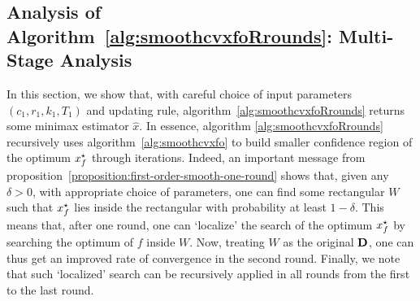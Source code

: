 

\subsection{Analysis of Algorithm~\ref{alg:smoothcvxfoRrounds}: Multi-Stage Analysis}
In this section, we show that, with careful choice of input parameters 
$(c_1, r_1, k_1, T_1)$ and updating rule, algorithm~\ref{alg:smoothcvxfoRrounds} 
returns some minimax estimator $\hat{x}$. In essence, algorithm 
\ref{alg:smoothcvxfoRrounds} recursively uses algorithm~\ref{alg:smoothcvxfo}
to build smaller confidence region of the optimum $x_f^\star$ through iterations.
Indeed, an important message from proposition~\ref{proposition:first-order-smooth-one-round} 
shows that, given any $\delta > 0$, with appropriate choice of parameters, one 
can find some rectangular $W$ such that $x_f^\star$ lies inside the rectangular 
with probability at least $1-\delta$. This means that, after one round, one can 
`localize' the search of the optimum $x_f^\star$ by searching the optimum of 
$f$ inside $W$. Now, treating $W$ as the original $\mathbf{D}$, one can 
thus get an improved rate of convergence in the second round. Finally, we note that 
such `localized' search can be recursively applied in all rounds from the first to 
the last round. 

